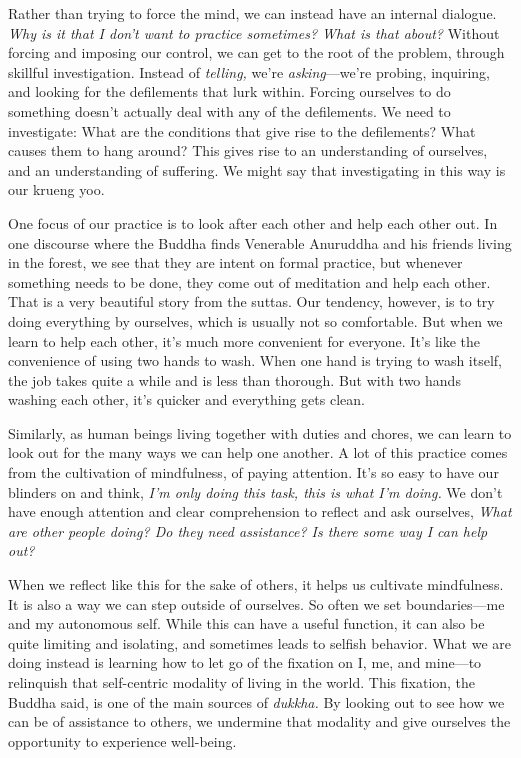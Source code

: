 Rather than trying to force the mind, we can instead have an internal 
dialogue. \emph{Why is it that I don't want to practice sometimes? What 
is that about?} Without forcing and imposing our control, we can get to 
the root of the problem, through skillful investigation. Instead of 
\emph{telling,} we're \emph{asking}---we're probing, inquiring, and 
looking for the defilements that lurk within. Forcing ourselves to do 
something doesn't actually deal with any of the defilements. We need to 
investigate: What are the conditions that give rise to the defilements? 
What causes them to hang around? This gives rise to an understanding of 
ourselves, and an understanding of suffering. We might say that 
investigating in this way is our krueng yoo.


One focus of our practice is to look after each other and help each 
other out. In one discourse where the Buddha finds Venerable Anuruddha 
and his friends living in the forest, we see that they are intent on 
formal practice, but whenever something needs to be done, they come out 
of meditation and help each other. That is a very beautiful story from 
the suttas. Our tendency, however, is to try doing everything by 
ourselves, which is usually not so comfortable. But when we learn to 
help each other, it's much more convenient for everyone. It's like the 
convenience of using two hands to wash. When one hand is trying to wash 
itself, the job takes quite a while and is less than thorough. But with 
two hands washing each other, it's quicker and everything gets clean.

Similarly, as human beings living together with duties and chores, we 
can learn to look out for the many ways we can help one another. A lot 
of this practice comes from the cultivation of mindfulness, of paying 
attention. It's so easy to have our blinders on and think, \emph{I'm 
only doing this task, this is what I'm doing.} We don't have enough 
attention and clear comprehension to reflect and ask ourselves, 
\emph{What are other people doing? Do they need assistance? Is there 
some way I can help out?}

When we reflect like this for the sake of others, it helps us cultivate 
mindfulness. It is also a way we can step outside of ourselves. So 
often we set boundaries---me and my autonomous self. While this can 
have a useful function, it can also be quite limiting and isolating, 
and sometimes leads to selfish behavior. What we are doing instead is 
learning how to let go of the fixation on I, me, and mine---to 
relinquish that self-centric modality of living in the world. This 
fixation, the Buddha said, is one of the main sources of \emph{dukkha.} 
By looking out to see how we can be of assistance to others, we 
undermine that modality and give ourselves the opportunity to 
experience well-being.

